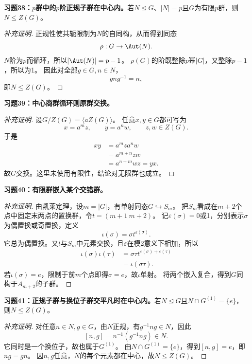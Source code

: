 \begin{problem}
\textbf{习题38：$p$群中的$p$阶正规子群在中心内。}若$N\trianglelefteq G$、$|N|=p$且$G$为有限$p$群，则$N\leq Z(G)$。
\end{problem}
\begin{proof}[补充证明]
正规性使共轭限制为$N$的自同构，从而得到同态
\[
\rho:G\to\Aut(N).
\]
$N$阶为$p$而循环，所以$|\Aut(N)|=p-1$。
$\rho(G)$的阶既整除$p$幂$|G|$，又整除$p-1$，所以为1。
因此对全部$g\in G,n\in N$，
\[
gng^{-1}=n,
\]
即$N\leq Z(G)$。
\end{proof}

\begin{problem}
\textbf{习题39：中心商群循环则原群交换。}
\end{problem}
\begin{proof}[补充证明]
设$G/Z(G)=\langle aZ(G)\rangle$。
任意$x,y\in G$都可写为
\[
x=a^mz,\qquad y=a^nw,\qquad z,w\in Z(G).
\]
于是
\begin{align*}
xy&=a^mza^nw\\
&=a^{m+n}zw\\
&=a^{n+m}wz=yx.
\end{align*}
故$G$交换。这里未使用有限性，结论对无限群也成立。
\end{proof}

\begin{problem}
\textbf{习题40：有限群嵌入某个交错群。}
\end{problem}
\begin{proof}[补充证明]
由凯莱定理，设$m=|G|$，有单射同态$G\hookrightarrow S_m$。
把$S_m$看成在$m+2$个点中固定末两点的置换群，令$t=(m+1\ m+2)$。
记$\varepsilon(\sigma)=0$或1，分别表示$\sigma$为偶置换或奇置换，定义
\[
\iota(\sigma)=\sigma t^{\varepsilon(\sigma)}.
\]
它总为偶置换。又$t$与$S_m$中元素交换，且$\varepsilon$在模2意义下相加，所以
\begin{align*}
\iota(\sigma)\iota(\tau)
&=\sigma\tau t^{\varepsilon(\sigma)+\varepsilon(\tau)}\\
&=\iota(\sigma\tau).
\end{align*}
若$\iota(\sigma)=e$，限制于前$m$个点即得$\sigma=e$，故$\iota$单射。
将两个嵌入复合，得到$G$同构于$A_{m+2}$的子群。
\end{proof}

\begin{problem}
\textbf{习题41：正规子群与换位子群交平凡时在中心内。}若$N\trianglelefteq G$且$N\cap G^{(1)}=\{e\}$，则$N\leq Z(G)$。
\end{problem}
\begin{proof}[补充证明]
对任意$n\in N,g\in G$，由$N$正规，有$g^{-1}ng\in N$，因此
\[
[n,g]=n^{-1}(g^{-1}ng)\in N.
\]
它同时是一个换位子，故也属于$G^{(1)}$。
由$N\cap G^{(1)}=\{e\}$，得到$[n,g]=e$，即$ng=gn$。
因$n,g$任意，$N$的每个元素都在中心，故$N\leq Z(G)$。
\end{proof}

